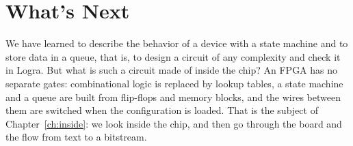 \section{What's Next}

We have learned to describe the behavior of a device with a state machine and to
store data in a queue, that is, to design a circuit of any complexity and check
it in Logra. But what is such a circuit made of inside the chip? An FPGA has no
separate gates: combinational logic is replaced by lookup tables, a state
machine and a queue are built from flip-flops and memory blocks, and the wires
between them are switched when the configuration is loaded. That is the subject
of Chapter~\ref{ch:inside}: we look inside the chip, and then go through the
board and the flow from text to a bitstream.
